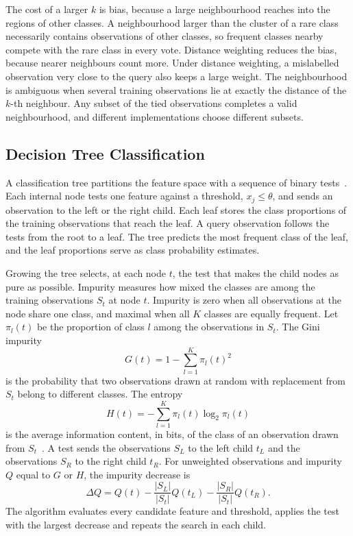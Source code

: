 \documentclass[conference]{IEEEtran}
\begin{document}
The cost of a larger $k$ is bias, because a large neighbourhood reaches into the regions of other classes. A neighbourhood larger than the cluster of a rare class necessarily contains observations of other classes, so frequent classes nearby compete with the rare class in every vote. Distance weighting reduces the bias, because nearer neighbours count more. Under distance weighting, a mislabelled observation very close to the query also keeps a large weight. The neighbourhood is ambiguous when several training observations lie at exactly the distance of the $k$-th neighbour. Any subset of the tied observations completes a valid neighbourhood, and different implementations choose different subsets.

\subsection{Decision Tree Classification}
A classification tree partitions the feature space with a sequence of binary tests~\cite{breiman1984}. Each internal node tests one feature against a threshold, $x_j \le \theta$, and sends an observation to the left or the right child. Each leaf stores the class proportions of the training observations that reach the leaf. A query observation follows the tests from the root to a leaf. The tree predicts the most frequent class of the leaf, and the leaf proportions serve as class probability estimates.

Growing the tree selects, at each node $t$, the test that makes the child nodes as pure as possible. Impurity measures how mixed the classes are among the training observations $S_t$ at node $t$. Impurity is zero when all observations at the node share one class, and maximal when all $K$ classes are equally frequent. Let $\pi_l(t)$ be the proportion of class $l$ among the observations in $S_t$. The Gini impurity
\begin{equation}
    G(t) = 1 - \sum_{l=1}^{K} \pi_l(t)^2
\end{equation}
is the probability that two observations drawn at random with replacement from $S_t$ belong to different classes. The entropy
\begin{equation}
    H(t) = -\sum_{l=1}^{K} \pi_l(t) \log_2 \pi_l(t)
\end{equation}
is the average information content, in bits, of the class of an observation drawn from $S_t$~\cite{hastie2009}. A test sends the observations $S_L$ to the left child $t_L$ and the observations $S_R$ to the right child $t_R$. For unweighted observations and impurity $Q$ equal to $G$ or $H$, the impurity decrease is
\begin{equation}
    \Delta Q = Q(t) - \frac{|S_L|}{|S_t|}Q(t_L) - \frac{|S_R|}{|S_t|}Q(t_R).
\end{equation}
The algorithm evaluates every candidate feature and threshold, applies the test with the largest decrease and repeats the search in each child.
\end{document}
